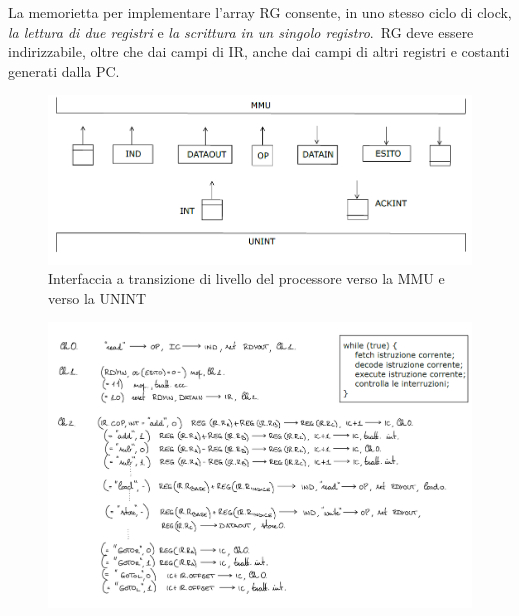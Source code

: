 \noindent La memorietta per implementare l'array RG consente, in uno stesso ciclo di clock, \textit{la lettura di due registri} e \textit{la scrittura in un singolo registro}.\
RG deve essere indirizzabile, oltre che dai campi di IR, anche dai campi di altri registri e costanti generati dalla PC.

\begin{figure}[H]
    \centering
    \includegraphics[width=\textwidth]{immagini/Interfaccia MMU.png}
    \caption*{Interfaccia a transizione di livello del processore verso la MMU e verso la UNINT}
\end{figure}
\begin{figure}[H]
    \centering
    \includegraphics[width=\textwidth]{immagini/Interprete.png}
\end{figure}

